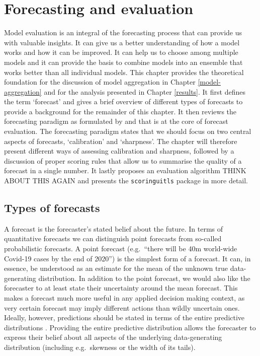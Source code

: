 \documentclass[
]{book}
\begin{document}
\hypertarget{evaluation}{%
\chapter{Forecasting and evaluation}\label{evaluation}}

Model evaluation is an integral of the forecasting process that can provide us with valuable insights. It can give us a better understanding of how a model works and how it can be improved. It can help us to choose among multiple models and it can provide the basis to combine models into an ensemble that works better than all individual models. This chapter provides the theoretical foundation for the discussion of model aggregation in Chapter \ref{model-aggregation} and for the analysis presented in Chapter \ref{results}. It first defines the term `forecast' and gives a brief overview of different types of forecasts to provide a background for the remainder of this chapter. It then reviews the forecasting paradigm as formulated by \citet{gneitingCalibratedProbabilisticForecasting2005} and \citet{gneitingProbabilisticForecastsCalibration2007} that is at the core of forecast evaluation. The forecasting paradigm states that we should focus on two central aspects of forecasts, `calibration' and `sharpness'. The chapter will therefore present different ways of assessing calibration and sharpness, followed by a discussion of proper scoring rules that allow us to summarise the quality of a forecast in a single number. It lastly proposes an evaluation algorithm THINK ABOUT THIS AGAIN and presents the \texttt{scoringuitls} package in more detail.

\hypertarget{types-of-forecasts}{%
\section{Types of forecasts}\label{types-of-forecasts}}

A forecast is the forecaster's stated belief about the future. In terms of quantitative forecasts we can distinguish point forecasts from so-called probabilistic forecasts. A point forecast (e.g.~``there will be 40m world-wide Covid-19 cases by the end of 2020'') is the simplest form of a forecast. It can, in essence, be understood as an estimate for the mean of the unknown true data-generating distribution. In addition to the point forecast, we would also like the forecaster to at least state their uncertainty around the mean forecast. This makes a forecast much more useful in any applied decision making context, as very certain forecast may imply different actions than wildly uncertain ones. Ideally, however, predictions should be stated in terms of the entire predictive distributions \citep{gneitingStrictlyProperScoring2007}. Providing the entire predictive distribution allows the forecaster to express their belief about all aspects of the underlying data-generating distribution (including e.g.~skewness or the width of its tails).
\end{document}
